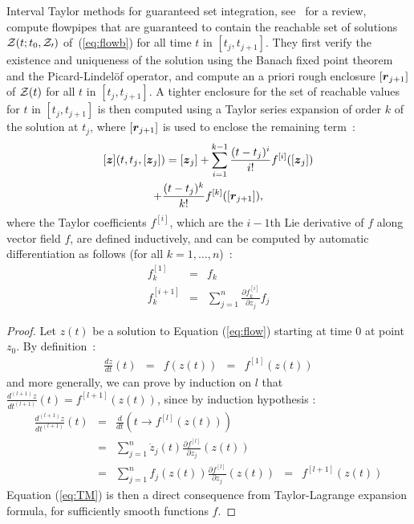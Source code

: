 \documentclass{sig-alternate-05-2015} %
\begin{document}
Interval Taylor methods for guaranteed set integration, see~\cite{Nedialkov99} for a review, compute flowpipes that are guaranteed
 to contain the reachable set of solutions 
${\cal Z}(t;t_0, {\cal Z_0})$ of~(\ref{eq:flowb}) for all time $t$ in $[t_j,t_{j+1}]$. They first verify the existence and uniqueness of 
the solution using the Banach fixed point theorem and the Picard-Lindel\"of operator, and compute an a priori rough enclosure $[{\r}_{j+1}]$ of 
   ${\cal Z}(t)$ for all $t$ in $[t_j,t_{j+1}]$. A tighter enclosure for the set of reachable values for $t$ in $[t_j,t_{j+1}]$ is then computed 
using a Taylor series expansion of order $k$ of the solution at $t_j$, where $[{\r}_{j+1}]$ is used to enclose the remaining term~: 
\begin{multline} 
[\z](t,t_j,[{\z}_j]) =  [{\z}_j] + \sum\limits_{i=1}^{k-1} \frac{(t-t_j)^i}{i !} f^{[i]}([{\z}_j])\\
 + \frac{(t-t_j)^k}{k !} f^{[k]}([{\r}_{j+1}]),
\label{eq:TM}
\end{multline}
where the Taylor coefficients $f^{[i]}$, which are the $i-1$th Lie derivative of $f$ along
vector field $f$, are defined inductively, and 
can be computed by automatic differentiation as follows (for all $k=1,\ldots,n$)~: 
\begin{eqnarray}
f^{[1]}_k & = & f_k \\
f^{[i+1]}_k & = & \sum\limits_{j=1}^n \frac{\partial{f^{[i]}_k}}{\partial z_j} f_j
\label{Lie1}
\end{eqnarray}

\begin{proof}
Let $z(t)$ be a solution to Equation (\ref{eq:flow}) starting at
time 0 at point $z_0$. By definition~: 
$$
\begin{array}{rclcl}
\frac{d z}{d t}(t) & = & f(z(t)) & = & f^{[1]}(z(t))
\end{array}$$
\noindent and more generally, we can prove by induction on $l$ that 
$\frac{d^{(l+1)} z}{dt^{(l+1)}}(t) = f^{[l+1]}(z(t))$, 
since by induction hypothesis :
$$\begin{array}{rclcl}
\frac{d^{(l+1)} z}{dt^{(l+1)}}(t) & = & \frac{d}{dt}\left(t \rightarrow
f^{[l]}(z(t))\right) \\
& = & \sum\limits_{j=1}^n \dot{z}_j(t) \frac{\partial f^{[l]}}{\partial z_j}(z(t)) \\
& = & \sum\limits_{j=1}^n f_j(z(t)) \frac{\partial f^{[l]}}{\partial z_j}(z(t)) 
& = & f^{[l+1]}(z(t))
\end{array}$$
Equation (\ref{eq:TM}) is then a direct consequence from Taylor-La\-grange expansion
formula, for sufficiently smooth functions $f$. 
\end{proof}
\end{document}
